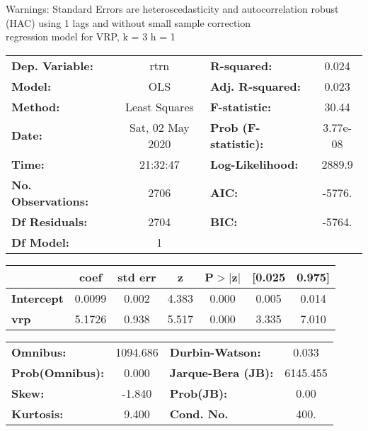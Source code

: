 Warnings: \newline
 [1] Standard Errors are heteroscedasticity and autocorrelation robust (HAC) using 1 lags and without small sample correction\\ 

regression model for VRP, k = 3 h = 1\begin{center}
\begin{tabular}{lclc}
\toprule
\textbf{Dep. Variable:}    &       rtrn       & \textbf{  R-squared:         } &     0.024   \\
\textbf{Model:}            &       OLS        & \textbf{  Adj. R-squared:    } &     0.023   \\
\textbf{Method:}           &  Least Squares   & \textbf{  F-statistic:       } &     30.44   \\
\textbf{Date:}             & Sat, 02 May 2020 & \textbf{  Prob (F-statistic):} &  3.77e-08   \\
\textbf{Time:}             &     21:32:47     & \textbf{  Log-Likelihood:    } &    2889.9   \\
\textbf{No. Observations:} &        2706      & \textbf{  AIC:               } &    -5776.   \\
\textbf{Df Residuals:}     &        2704      & \textbf{  BIC:               } &    -5764.   \\
\textbf{Df Model:}         &           1      & \textbf{                     } &             \\
\bottomrule
\end{tabular}
\begin{tabular}{lcccccc}
                   & \textbf{coef} & \textbf{std err} & \textbf{z} & \textbf{P$> |$z$|$} & \textbf{[0.025} & \textbf{0.975]}  \\
\midrule
\textbf{Intercept} &       0.0099  &        0.002     &     4.383  &         0.000        &        0.005    &        0.014     \\
\textbf{vrp}       &       5.1726  &        0.938     &     5.517  &         0.000        &        3.335    &        7.010     \\
\bottomrule
\end{tabular}
\begin{tabular}{lclc}
\textbf{Omnibus:}       & 1094.686 & \textbf{  Durbin-Watson:     } &    0.033  \\
\textbf{Prob(Omnibus):} &   0.000  & \textbf{  Jarque-Bera (JB):  } & 6145.455  \\
\textbf{Skew:}          &  -1.840  & \textbf{  Prob(JB):          } &     0.00  \\
\textbf{Kurtosis:}      &   9.400  & \textbf{  Cond. No.          } &     400.  \\
\bottomrule
\end{tabular}
\end{center}

